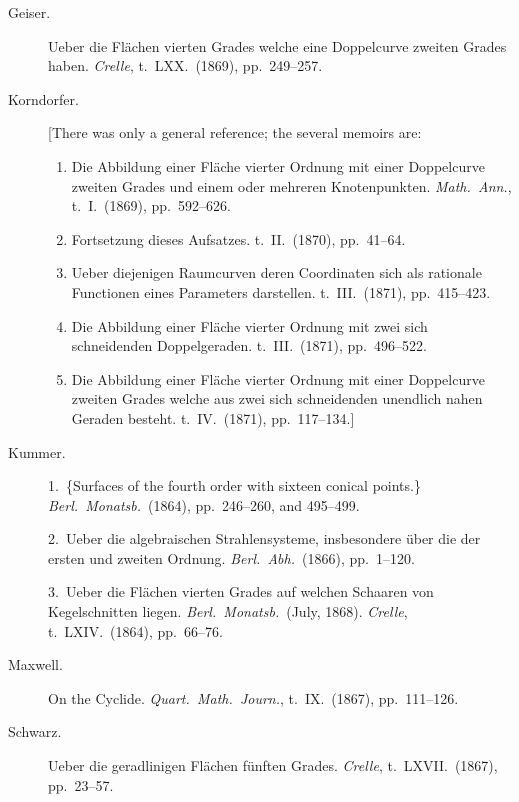 \documentclass[11pt]{article}
\begin{document}
\begin{description}
\item[Geiser.] Ueber die Fl\"achen vierten Grades welche eine Doppelcurve zweiten Grades haben. \textit{Crelle}, t.\ LXX.\ (1869), pp.~249--257.

\item[Korndorfer.] [There was only a general reference; the several memoirs are:
\begin{enumerate}
\item Die Abbildung einer Fl\"ache vierter Ordnung mit einer Doppelcurve zweiten Grades und einem oder mehreren Knotenpunkten. \textit{Math.\ Ann.}, t.\ I.\ (1869), pp.~592--626.
\item Fortsetzung dieses Aufsatzes. t.\ II.\ (1870), pp.~41--64.
\item Ueber diejenigen Raumcurven deren Coordinaten sich als rationale Functionen eines Parameters darstellen. t.\ III.\ (1871), pp.~415--423.
\item Die Abbildung einer Fl\"ache vierter Ordnung mit zwei sich schneidenden Doppelgeraden. t.\ III.\ (1871), pp.~496--522.
\item Die Abbildung einer Fl\"ache vierter Ordnung mit einer Doppelcurve zweiten Grades welche aus zwei sich schneidenden unendlich nahen Geraden besteht. t.\ IV.\ (1871), pp.~117--134.]
\end{enumerate}

\item[Kummer.] 1.\ \{Surfaces of the fourth order with sixteen conical points.\} \textit{Berl.\ Monatsb.}\ (1864), pp.~246--260, and 495--499.

\item[] 2.\ Ueber die algebraischen Strahlensysteme, insbesondere \"uber die der ersten und zweiten Ordnung. \textit{Berl.\ Abh.}\ (1866), pp.~1--120.

\item[] 3.\ Ueber die Fl\"achen vierten Grades auf welchen Schaaren von Kegelschnitten liegen. \textit{Berl.\ Monatsb.}\ (July, 1868). \textit{Crelle}, t.\ LXIV.\ (1864), pp.~66--76.

\item[Maxwell.] On the Cyclide. \textit{Quart.\ Math.\ Journ.}, t.\ IX.\ (1867), pp.~111--126.

\item[Schwarz.] Ueber die geradlinigen Fl\"achen f\"unften Grades. \textit{Crelle}, t.\ LXVII.\ (1867), pp.~23--57.
\end{description}
\end{document}
